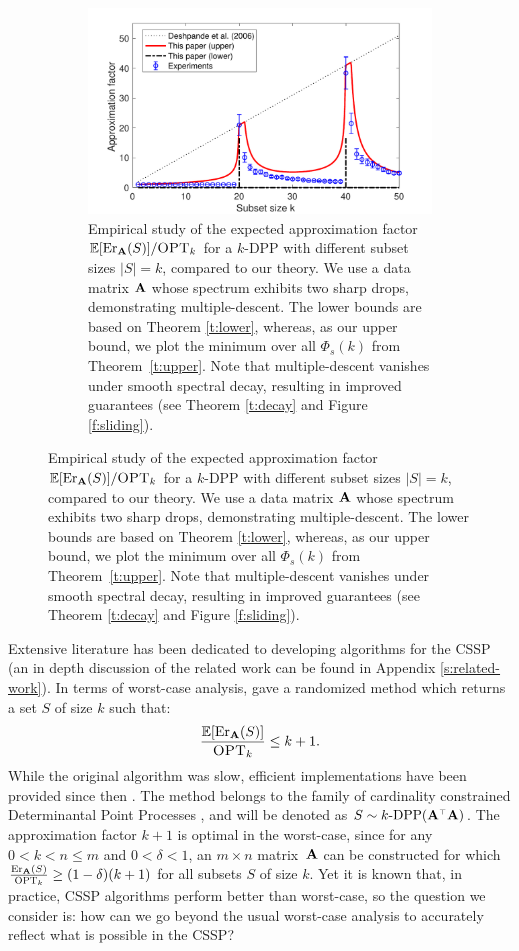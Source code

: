 \documentclass{article}
\begin{document}
\ifisarxiv\begin{figure}\else
\begin{figure}
  \vspace{-5mm}
  \fi
  \centering  
  \includegraphics[width=\ifisarxiv 0.6\else 0.47\fi\textwidth]{figs/nystrom/nystrom-bounds}
  \caption{Empirical study of the
    expected approximation factor $\mathbb E[\mathrm{Er}_\mathbf A(S)]/{\textsc{OPT}_k}$ for
a $k$-DPP with
    different subset sizes $|S|=k$, compared to our theory. We use a
    data matrix $\mathbf A$ 
    whose
    spectrum exhibits two sharp drops, demonstrating
multiple-descent. The lower bounds are based on Theorem
    \ref{t:lower}, whereas, as our upper bound, we plot the
    minimum over all $\Phi_s(k)$ from
    Theorem~\ref{t:upper}. Note that multiple-descent vanishes under
    smooth spectral decay, resulting in improved guarantees (see
    Theorem \ref{t:decay} and Figure \ref{f:sliding}).
  }
  \label{f:intro}
  \ifisarxiv\end{figure}\else
  \end{figure}\fi


Extensive literature has been dedicated to developing algorithms for
the CSSP (an in depth discussion of the related work can be found in
Appendix \ref{s:related-work}).
In terms of worst-case analysis, 
\citet{pca-volume-sampling} gave a randomized
method 
which returns a
set $S$ of size $k$ such that: %
\begin{align}
  \frac{\mathbb E[\mathrm{Er}_\mathbf A(S)]}{{\textsc{OPT}_k}}\leq k+1.\label{eq:old-bound}
\end{align}
While the original algorithm was slow, 
efficient implementations have been provided since then
\citep[e.g., see][]{efficient-volume-sampling,dpp-intermediate}.
The method belongs to the family of cardinality constrained
Determinantal Point Processes \citep[DPPs, see][]{dpps-in-randnla}, and will
be denoted as $S\sim k\text{-}\DPP(\A^\top\A)$. 
The approximation  factor  $k+1$ is optimal in the worst-case,
since for any $0<k<n\leq m$ and $0<\delta<1$, an $m\times n$
matrix~$\mathbf A$ can be constructed for which $\frac{\mathrm{Er}_{\mathbf A}(S)}{{\textsc{OPT}_k}}\geq
(1-\delta)(k+1)$ for all subsets $S$ of size $k$. 
Yet it is known that, in practice, CSSP algorithms perform better
than worst-case, so the question we consider is: how can we go beyond
the usual worst-case analysis to accurately reflect what is possible
in the CSSP?  
\end{document}
